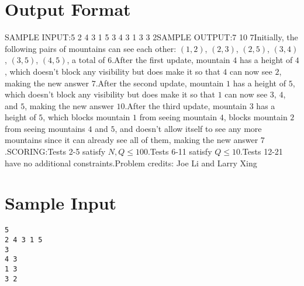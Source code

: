 \documentclass[12pt]{article}
\begin{document}
\section*{Output Format}
SAMPLE INPUT:5
2 4 3 1 5
3
4 3
1 3
3 2SAMPLE OUTPUT:7
10
7Initially, the following pairs of mountains can see each other: $(1, 2)$,
$(2, 3)$, $(2, 5)$, $(3, 4)$, $(3, 5)$, $(4, 5)$, a total of $6$.After the first update, mountain $4$ has a height of $4$, which doesn't block
any visibility but does make it so that $4$ can now see $2$, making the new
answer $7$.After the second update, mountain $1$ has a height of $5$, which doesn't block
any visibility but does make it so that $1$ can now see $3$, $4$, and $5$,
making the new answer $10$.After the third update, mountain $3$ has a height of $5$, which blocks mountain
$1$ from seeing mountain $4$, blocks mountain $2$ from seeing mountains $4$ and
$5$, and doesn't allow itself to see any more mountains since it can already see
all of them, making the new answer
$7$.SCORING:Tests 2-5 satisfy $N, Q\le 100$.Tests 6-11 satisfy $Q \leq 10$.Tests 12-21 have no additional constraints.Problem credits: Joe Li and Larry Xing

\section*{Sample Input}
\begin{verbatim}
5
2 4 3 1 5
3
4 3
1 3
3 2
\end{verbatim}
\end{document}
